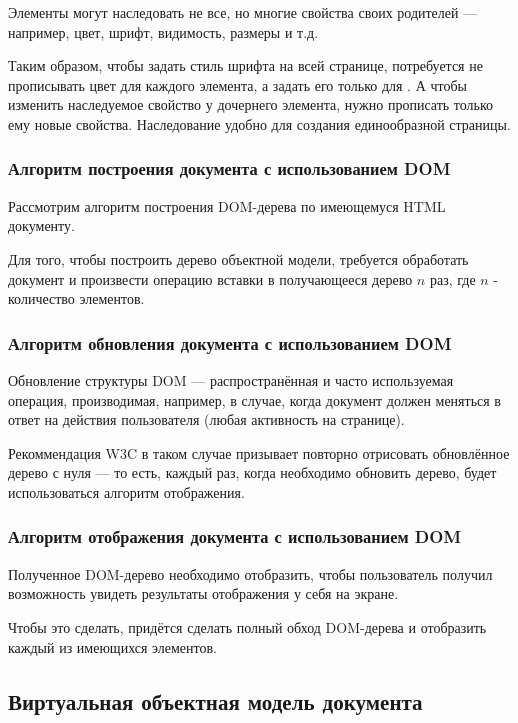\clearpage

Элементы могут наследовать не все, но многие свойства своих родителей --- например, цвет, шрифт, видимость, размеры и т.д.

Таким образом, чтобы задать стиль шрифта на всей странице, потребуется не прописывать цвет для каждого элемента, а задать его только для . 
А чтобы изменить наследуемое свойство у дочернего элемента, нужно прописать только ему новые свойства. 
Наследование удобно для создания единообразной страницы.


\subsubsection{Алгоритм построения документа с использованием  DOM}

Рассмотрим алгоритм построения DOM-дерева по имеющемуся HTML документу.

Для того, чтобы построить дерево объектной модели, требуется обработать документ и произвести операцию вставки в получающееся дерево $n$ раз, где $n$ - количество элементов.

\subsubsection{Алгоритм обновления документа с использованием DOM}

Обновление структуры DOM --- распространённая и часто используемая операция, производимая, например, в случае, когда документ должен меняться в ответ на действия пользователя (любая активность на странице).

Рекоммендация W3C в таком случае призывает повторно отрисовать обновлённое дерево с нуля --- то есть, каждый раз, когда необходимо обновить дерево, будет использоваться алгоритм отображения.


\subsubsection{Алгоритм отображения документа с использованием DOM}

Полученное DOM-дерево необходимо отобразить, чтобы пользователь получил возможность увидеть результаты отображения у себя на экране.

Чтобы это сделать, придётся сделать полный обход DOM-дерева и отобразить каждый из имеющихся элементов.

\clearpage

\subsection{Виртуальная объектная модель документа}

